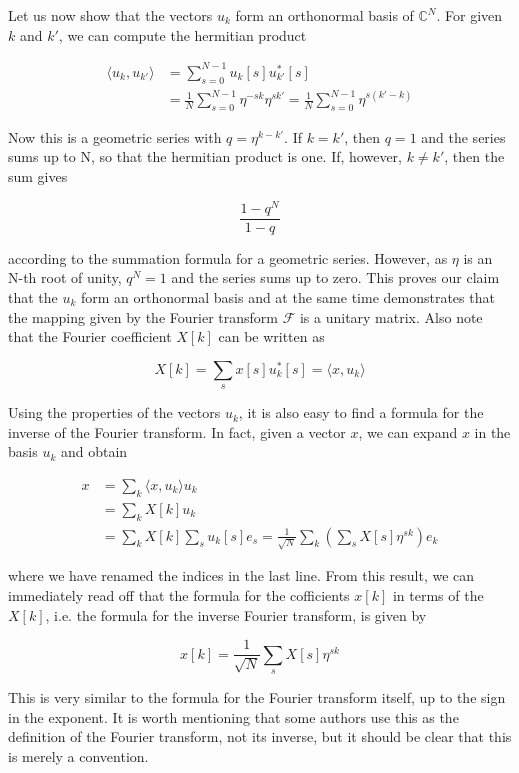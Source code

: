 \documentclass[a4paper, draft]{article}
\theoremstyle{own}
\theoremstyle{remark}
\newcommand{\C}{\mathbb{C}}
\begin{document}
Let us now show that the vectors $u_k$ form an orthonormal basis of $\C^N$. For given $k$ and $k'$, we can compute the hermitian product

\begin{align*}
\langle u_k, u_{k'} \rangle &= \sum_{s=0}^{N-1} u_k[s] u_{k'}^*[s] \\
&= \frac{1}{N} \sum_{s=0}^{N-1} \eta^{-sk} \eta^{sk'} = \frac{1}{N} \sum_{s=0}^{N-1} \eta^{s(k'-k)}
\end{align*}

Now this is a geometric series with $q = \eta^{k-k'}$. If $k = k'$, then $q = 1$ and the series sums up to N, so that the hermitian product is one. If, however, $k \neq k'$, then the sum gives

$$
\frac{1-q^N}{1-q}
$$

according to the summation formula for a geometric series. However, as $\eta$ is an N-th root of unity, $q^N = 1$ and the series sums up to zero. This proves our claim that the $u_k$ form an orthonormal basis and at the same time demonstrates that the mapping given by the Fourier transform $\mathcal{F}$ is a unitary matrix. Also note that the Fourier coefficient $X[k]$ can be written as

$$
X[k] = \sum_s x[s] u_k^*[s] = \langle x, u_k \rangle 
$$

Using the properties of the vectors $u_k$, it is also easy to find a formula for the inverse of the Fourier transform. In fact, given a vector $x$, we can expand $x$ in the basis $u_k$ and obtain

\begin{align*}
x &= \sum_k \langle x, u_k \rangle u_k \\
 &= \sum_k X[k] u_k \\
 &= \sum_k X[k] \sum_s u_k[s] e_s = \frac{1}{\sqrt{N}} \sum_k (\sum_s X[s] \eta^{sk}) e_k
\end{align*}

where we have renamed the indices in the last line. From this result, we can immediately read off that the formula for the cofficients $x[k]$ in terms of the $X[k]$, i.e. the formula for the inverse Fourier transform, is given by

$$
x[k] = \frac{1}{\sqrt{N}} \sum_s X[s] \eta^{sk}
$$

This is very similar to the formula for the Fourier transform itself, up to the sign in the exponent. It is worth mentioning that some authors use this as the definition of the Fourier transform, not its inverse, but it should be clear that this is merely a convention. 
\end{document}
